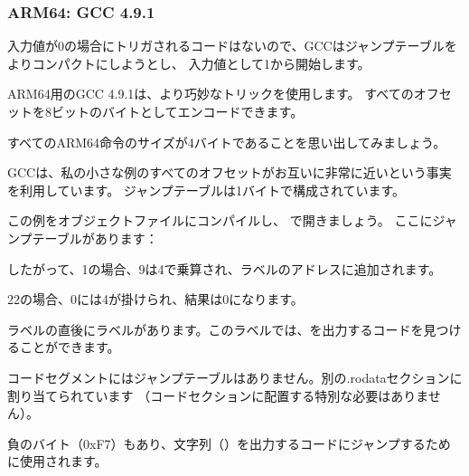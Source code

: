 \subsubsection{ARM64: \Optimizing GCC 4.9.1}

入力値が0の場合にトリガされるコードはないので、GCCはジャンプテーブルをよりコンパクトにしようとし、
入力値として1から開始します。

ARM64用のGCC 4.9.1は、より巧妙なトリックを使用します。
すべてのオフセットを8ビットのバイトとしてエンコードできます。

すべてのARM64命令のサイズが4バイトであることを思い出してみましょう。

GCCは、私の小さな例のすべてのオフセットがお互いに非常に近いという事実を利用しています。
ジャンプテーブルは1バイトで構成されています。



この例をオブジェクトファイルにコンパイルし、 \IDA で開きましょう。 ここにジャンプテーブルがあります：



したがって、1の場合、9は4で乗算され、ラベルのアドレスに追加されます。

22の場合、0には4が掛けられ、結果は0になります。

ラベルの直後にラベルがあります。このラベルでは、を出力するコードを見つけることができます。

コードセグメントにはジャンプテーブルはありません。別の.rodataセクションに割り当てられています
（コードセクションに配置する特別な必要はありません）。

負のバイト（0xF7）もあり、文字列（）を出力するコードにジャンプするために使用されます。
